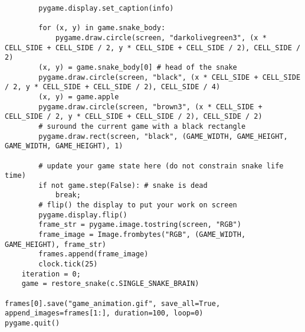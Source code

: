 \documentclass[11pt,a4paper]{article}
\begin{document}
\begin{verbatim}
        pygame.display.set_caption(info)

        for (x, y) in game.snake_body:
            pygame.draw.circle(screen, "darkolivegreen3", (x * CELL_SIDE + CELL_SIDE / 2, y * CELL_SIDE + CELL_SIDE / 2), CELL_SIDE / 2)
        (x, y) = game.snake_body[0] # head of the snake
        pygame.draw.circle(screen, "black", (x * CELL_SIDE + CELL_SIDE / 2, y * CELL_SIDE + CELL_SIDE / 2), CELL_SIDE / 4)
        (x, y) = game.apple
        pygame.draw.circle(screen, "brown3", (x * CELL_SIDE + CELL_SIDE / 2, y * CELL_SIDE + CELL_SIDE / 2), CELL_SIDE / 2)
        # suround the current game with a black rectangle
        pygame.draw.rect(screen, "black", (GAME_WIDTH, GAME_HEIGHT, GAME_WIDTH, GAME_HEIGHT), 1)

        # update your game state here (do not constrain snake life time)
        if not game.step(False): # snake is dead
            break;
        # flip() the display to put your work on screen
        pygame.display.flip()
        frame_str = pygame.image.tostring(screen, "RGB")
        frame_image = Image.frombytes("RGB", (GAME_WIDTH, GAME_HEIGHT), frame_str)
        frames.append(frame_image)
        clock.tick(25)
    iteration = 0;
    game = restore_snake(c.SINGLE_SNAKE_BRAIN)

frames[0].save("game_animation.gif", save_all=True, append_images=frames[1:], duration=100, loop=0)
pygame.quit()

\end{verbatim}
\end{document}
